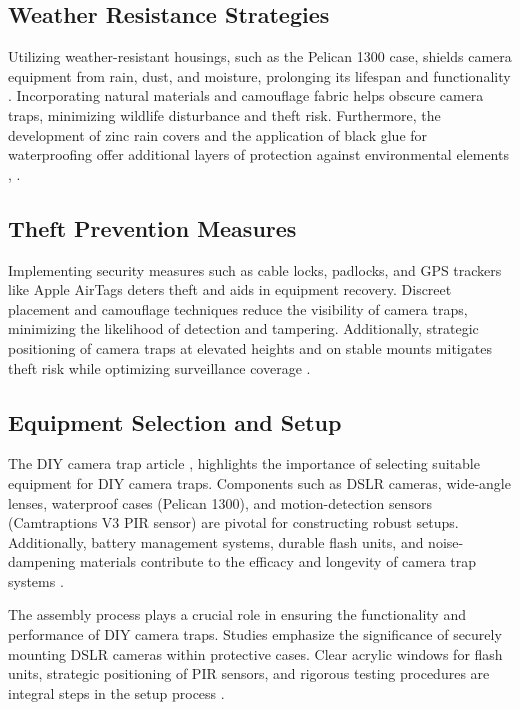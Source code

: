 \documentclass[class=report,11pt,crop=false]{standalone}
\begin{document}
 

 

\subsection{Weather Resistance Strategies}

Utilizing weather-resistant housings, such as the Pelican 1300 case, shields camera equipment from rain, dust, and moisture, prolonging its lifespan and functionality \cite{kays2009camera}. Incorporating natural materials and camouflage fabric helps obscure camera traps, minimizing wildlife disturbance and theft risk. Furthermore, the development of zinc rain covers and the application of black glue for waterproofing offer additional layers of protection against environmental elements \cite{kays2009camera}, \cite{glover2019camera}. 

 

\subsection{Theft Prevention Measures} 

Implementing security measures such as cable locks, padlocks, and GPS trackers like Apple AirTags deters theft and aids in equipment recovery. Discreet placement and camouflage techniques reduce the visibility of camera traps, minimizing the likelihood of detection and tampering. Additionally, strategic positioning of camera traps at elevated heights and on stable mounts mitigates theft risk while optimizing surveillance coverage \cite{kays2009camera}. 


  

\subsection{Equipment Selection and Setup}

The DIY camera trap article \cite{diyarticle2023}, highlights the importance of selecting suitable equipment for DIY camera traps. Components such as DSLR cameras, wide-angle lenses, waterproof cases (Pelican 1300), and motion-detection sensors (Camtraptions V3 PIR sensor) are pivotal for constructing robust setups. Additionally, battery management systems, durable flash units, and noise-dampening materials contribute to the efficacy and longevity of camera trap systems \cite{diyarticle2023}.
 
The assembly process plays a crucial role in ensuring the functionality and performance of DIY camera traps. Studies emphasize the significance of securely mounting DSLR cameras within protective cases. Clear acrylic windows for flash units, strategic positioning of PIR sensors, and rigorous testing procedures are integral steps in the setup process \cite{diyarticle2023}.
\end{document}
